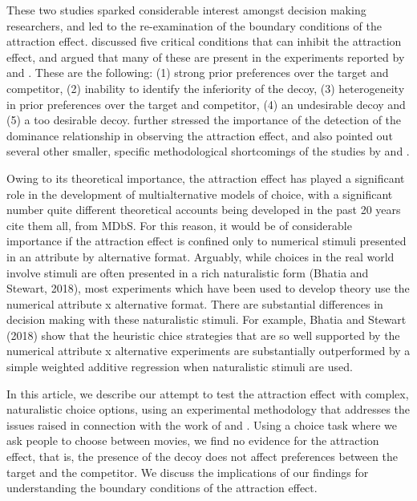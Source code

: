 \documentclass[12pt, a4paper]{article}
\begin{document}
These two studies sparked considerable interest amongst decision making researchers, and led to the re-examination of the boundary conditions of the attraction effect.  discussed five critical conditions that can inhibit the attraction effect, and argued that many of these are present in the experiments reported by \citeauthor{Frederick2014} and \citeauthor{Yang2014}. These are the following: (1) strong prior preferences over the target and competitor, (2) inability to identify the inferiority of the decoy, (3) heterogeneity in prior preferences over the target and competitor, (4) an undesirable decoy and (5) a too desirable decoy.  further stressed the importance of the detection of the dominance relationship in observing the attraction effect, and also pointed out several other smaller, specific methodological shortcomings of the studies by \citeauthor{Frederick2014} and \citeauthor{Yang2014}.


Owing to its theoretical importance, the attraction effect has played a significant role in the development of multialternative models of choice, with a significant number quite different theoretical accounts being developed in the past 20 years {cite them all, from MDbS}. For this reason, it would be of considerable importance if the attraction effect is confined only to numerical stimuli presented in an attribute by alternative format. Arguably, while choices in the real world involve stimuli are often presented in a rich naturalistic form (Bhatia and Stewart, 2018), most experiments which have been used to develop theory use the numerical attribute x alternative format. There are substantial differences in decision making with these naturalistic stimuli. For example, Bhatia and Stewart (2018) show that the heuristic chice strategies that are so well supported by  the numerical attribute x alternative experiments are substantially outperformed by a simple weighted additive regression when naturalistic stimuli are used.

In this article, we describe our attempt to test the attraction effect with complex, naturalistic choice options, using an experimental methodology that addresses the issues raised in connection with the work of \citeauthor{Frederick2014} and \citeauthor{Yang2014}. Using a choice task where we ask people to choose between movies, we find no evidence for the attraction effect, that is, the presence of the decoy does not affect preferences between the target and the competitor. We discuss the implications of our findings for understanding the boundary conditions of the attraction effect.
\end{document}
